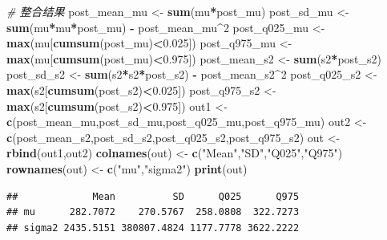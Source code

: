 \documentclass[
]{book}
\newenvironment{Shaded}{\begin{snugshade}}{\end{snugshade}}
\newcommand{\CommentTok}[1]{\textcolor[rgb]{0.56,0.35,0.01}{\textit{#1}}}
\newcommand{\DecValTok}[1]{\textcolor[rgb]{0.00,0.00,0.81}{#1}}
\newcommand{\FloatTok}[1]{\textcolor[rgb]{0.00,0.00,0.81}{#1}}
\newcommand{\FunctionTok}[1]{\textcolor[rgb]{0.13,0.29,0.53}{\textbf{#1}}}
\newcommand{\NormalTok}[1]{#1}
\newcommand{\OtherTok}[1]{\textcolor[rgb]{0.56,0.35,0.01}{#1}}
\newcommand{\SpecialCharTok}[1]{\textcolor[rgb]{0.81,0.36,0.00}{\textbf{#1}}}
\newcommand{\StringTok}[1]{\textcolor[rgb]{0.31,0.60,0.02}{#1}}
\begin{document}
\begin{Shaded}
\begin{Highlighting}[]
\CommentTok{\# 整合结果}
\NormalTok{post\_mean\_mu }\OtherTok{\textless{}{-}} \FunctionTok{sum}\NormalTok{(mu}\SpecialCharTok{*}\NormalTok{post\_mu)}
\NormalTok{post\_sd\_mu   }\OtherTok{\textless{}{-}} \FunctionTok{sum}\NormalTok{(mu}\SpecialCharTok{*}\NormalTok{mu}\SpecialCharTok{*}\NormalTok{post\_mu) }\SpecialCharTok{{-}}\NormalTok{ post\_mean\_mu}\SpecialCharTok{\^{}}\DecValTok{2}
\NormalTok{post\_q025\_mu }\OtherTok{\textless{}{-}} \FunctionTok{max}\NormalTok{(mu[}\FunctionTok{cumsum}\NormalTok{(post\_mu)}\SpecialCharTok{\textless{}}\FloatTok{0.025}\NormalTok{])}
\NormalTok{post\_q975\_mu }\OtherTok{\textless{}{-}} \FunctionTok{max}\NormalTok{(mu[}\FunctionTok{cumsum}\NormalTok{(post\_mu)}\SpecialCharTok{\textless{}}\FloatTok{0.975}\NormalTok{])}
\NormalTok{post\_mean\_s2 }\OtherTok{\textless{}{-}} \FunctionTok{sum}\NormalTok{(s2}\SpecialCharTok{*}\NormalTok{post\_s2)}
\NormalTok{post\_sd\_s2   }\OtherTok{\textless{}{-}} \FunctionTok{sum}\NormalTok{(s2}\SpecialCharTok{*}\NormalTok{s2}\SpecialCharTok{*}\NormalTok{post\_s2) }\SpecialCharTok{{-}}\NormalTok{ post\_mean\_s2}\SpecialCharTok{\^{}}\DecValTok{2}
\NormalTok{post\_q025\_s2 }\OtherTok{\textless{}{-}} \FunctionTok{max}\NormalTok{(s2[}\FunctionTok{cumsum}\NormalTok{(post\_s2)}\SpecialCharTok{\textless{}}\FloatTok{0.025}\NormalTok{])}
\NormalTok{post\_q975\_s2 }\OtherTok{\textless{}{-}} \FunctionTok{max}\NormalTok{(s2[}\FunctionTok{cumsum}\NormalTok{(post\_s2)}\SpecialCharTok{\textless{}}\FloatTok{0.975}\NormalTok{])}
\NormalTok{out1 }\OtherTok{\textless{}{-}} \FunctionTok{c}\NormalTok{(post\_mean\_mu,post\_sd\_mu,post\_q025\_mu,post\_q975\_mu)}
\NormalTok{out2 }\OtherTok{\textless{}{-}} \FunctionTok{c}\NormalTok{(post\_mean\_s2,post\_sd\_s2,post\_q025\_s2,post\_q975\_s2)}
\NormalTok{out  }\OtherTok{\textless{}{-}} \FunctionTok{rbind}\NormalTok{(out1,out2)}
\FunctionTok{colnames}\NormalTok{(out) }\OtherTok{\textless{}{-}} \FunctionTok{c}\NormalTok{(}\StringTok{"Mean"}\NormalTok{,}\StringTok{"SD"}\NormalTok{,}\StringTok{"Q025"}\NormalTok{,}\StringTok{"Q975"}\NormalTok{)}
\FunctionTok{rownames}\NormalTok{(out) }\OtherTok{\textless{}{-}} \FunctionTok{c}\NormalTok{(}\StringTok{"mu"}\NormalTok{,}\StringTok{"sigma2"}\NormalTok{)}
\FunctionTok{print}\NormalTok{(out)}
\end{Highlighting}
\end{Shaded}

\begin{verbatim}
##             Mean          SD      Q025      Q975
## mu      282.7072    270.5767  258.0808  322.7273
## sigma2 2435.5151 380807.4824 1177.7778 3622.2222
\end{verbatim}
\end{document}
